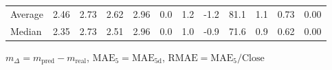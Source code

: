 \begin{threeparttable}
{\begin{tabular}{lrrrrrrrrrrr}
Average &          2.46 &          2.73 &          2.62 &        2.96 &                 0.0 &                 1.2 &       -1.2 &                81.1 &              1.1 &            0.73 &                   0.00 \\
 Median &          2.35 &          2.73 &          2.51 &        2.96 &                 0.0 &                 1.0 &       -0.9 &                71.6 &              0.9 &            0.62 &                   0.00 \\
\bottomrule
\end{tabular}
}
\begin{tablenotes}\footnotesize
\item $m_\Delta=m_{\text{pred}}-m_{\text{real}}$,
$\mathrm{MAE}_5=\mathrm{MAE}_{5\text{d}}$,
$\mathrm{RMAE}=\mathrm{MAE}_5/\text{Close}$
\end{tablenotes}
\end{threeparttable}
\endgroup

